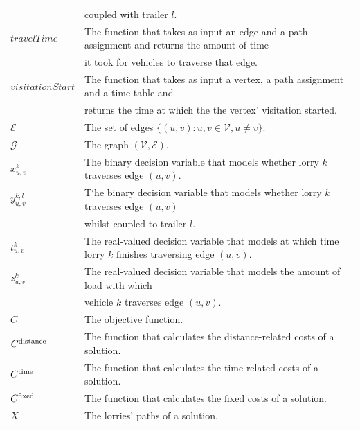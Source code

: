 \begin{longtable}{ll}
&  coupled with trailer $l$. \\
$travelTime$ & The function that takes as input an edge and a path assignment and returns the amount of time \\
&  it took for vehicles to traverse that edge.\\
$visitationStart$ & The function that takes as input a vertex, a path assignment and a time table and \\
& returns the time at which the the vertex' visitation started. \\
$\mathcal E $ & The set of edges $ \{ (u,v): u,v \in \mathcal V , u \neq v \} $. \\
$\mathcal G $ & The graph $ (\mathcal V, \mathcal E) $. \\
$x^k_{u,v}$ & The binary decision variable that models whether lorry $k$ traverses edge $(u,v)$. \\
$y^{k,l}_{u,v}$ & T`he binary decision variable that models whether lorry $k$ traverses edge $(u,v)$ \\
& whilst coupled to trailer $l$. \\
$t^k_{u,v}$ & The real-valued decision variable that models at which time lorry $k$ finishes traversing edge $(u,v)$. \\
$z^k_{u,v}$ & The real-valued decision variable that models the amount of load with which \\
&   vehicle $k$ traverses edge $(u,v)$. \\
$C$ & The objective function. \\
$C^{\rm distance}$ & The function that calculates the distance-related costs of a solution. \\
$C^{\rm time}$ & The function that calculates the time-related costs of a solution. \\
$C^{\rm fixed}$ & The function that calculates the fixed costs of a solution. \\
$X$ & The lorries' paths of a solution.  \\

\end{longtable}
